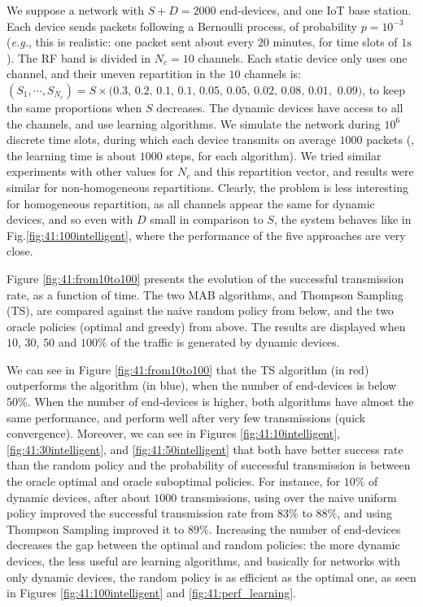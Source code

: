 We suppose a network with $S + D = 2000$ end-devices, and one IoT base station.
Each device sends packets following a Bernoulli process, of probability $p = 10^{-3}$ (\emph{e.g.}, this is realistic: one packet sent about every $20$ minutes, for time slots of $1\mathrm{s}$).
The RF band is divided in $N_c = 10$ channels.
Each static device only uses one channel, and their uneven repartition in the $10$ channels is: $(S_1,\cdots, S_{N_c}) = S\times(0.3, \, 0.2, \, 0.1, \, 0.1, \, 0.05, \, 0.05, \, 0.02, \, 0.08, \, 0.01,$ $0.09)$, to keep the same proportions when $S$ decreases. The dynamic devices have access to all the channels, and use learning algorithms.
%
We simulate the network during $10^6$ discrete time slots, during which each device transmits on average $1000$ packets (\ie, the learning time is about $1000$ steps, for each algorithm).
We tried similar experiments with other values for $N_c$ and this repartition vector, and results were similar for non-homogeneous repartitions. Clearly, the problem is less interesting for homogeneous repartition, as all channels appear the same for dynamic devices, and so even with $D$ small in comparison to $S$, the system behaves like in Fig.\ref{fig:41:100intelligent}, where the performance of the five approaches are very close.

Figure \ref{fig:41:from10to100} presents the evolution of the successful transmission rate, as a function of time. %
The two MAB algorithms, \UCB{} and Thompson Sampling (TS), are compared against the naive random policy from below, and the two oracle policies (optimal and greedy) from above.
The results are displayed when $10$, $30$, $50$ and $100\%$ of the traffic is generated by dynamic devices.

We can see in Figure \ref{fig:41:from10to100} that the TS algorithm (in red) outperforms the \UCB{} algorithm (in blue), when the number of end-devices is below 50\%. When the number of end-devices is higher, both algorithms have almost the same performance, and perform well after very few transmissions (quick convergence).
Moreover, we can see in Figures \ref{fig:41:10intelligent}, \ref{fig:41:30intelligent}, and \ref{fig:41:50intelligent} that both have better success rate than the random policy and the probability of successful transmission is between the oracle optimal and oracle suboptimal policies.
For instance, for $10\%$ of dynamic devices, after about $1000$ transmissions, using \UCB{} over the naive uniform policy improved the successful transmission rate from $83\%$ to $88\%$, and using Thompson Sampling improved it to $89\%$.
Increasing the number of end-devices decreases the gap between the optimal and random policies: the more dynamic devices, the less useful are learning algorithms, and basically for networks with only dynamic devices, the random policy is as efficient as the optimal one, as seen in Figures \ref{fig:41:100intelligent} and \ref{fig:41:perf_learning}.

